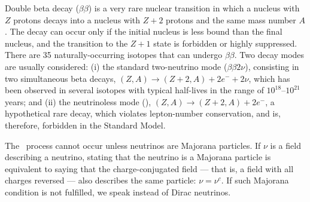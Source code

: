 Double beta decay ($\beta\beta$) is a very rare nuclear transition in which a nucleus with $Z$ protons decays into a nucleus with $Z + 2$ protons and the same mass number $A$. The decay can occur only if the initial nucleus is less bound than the final nucleus, and the transition to the $Z+1$ state is forbidden or highly suppressed. There are 35 naturally-occurring isotopes that can undergo $\beta\beta$. Two decay modes are usually considered: (i) the standard two-neutrino mode ($\beta\beta2\nu$), consisting in two simultaneous beta decays, $(Z,A) \rightarrow (Z + 2,A) + 2 e^- +2 \nu$, which has been observed in several isotopes with typical half-lives in the range of $10^{18}$--$10^{21}$ years; and (ii) the neutrinoless mode (\bbonu), $(Z,A) \rightarrow (Z +2, A) + 2 e^-$, a hypothetical rare decay, which violates lepton-number conservation, and is, therefore, forbidden in the Standard Model.

The \bbonu\ process cannot occur unless neutrinos are Majorana particles. 
%
%
%
%
If $\nu$ is a field describing a neutrino, stating that the neutrino is a Majorana particle is equivalent to saying that the charge-conjugated field --- that is, a field with all charges reversed --- also describes the same particle: $\nu=\nu^c$. If such Majorana condition is not fulfilled, we speak instead of Dirac neutrinos. 

